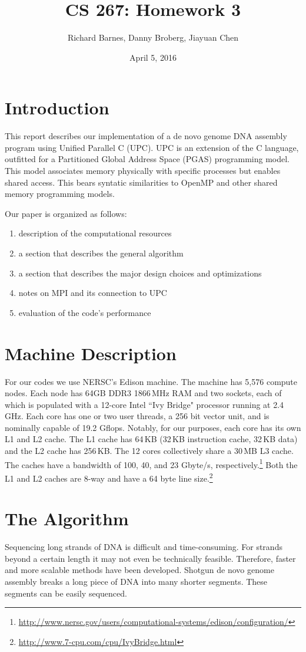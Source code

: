 \documentclass{article}
\title{CS 267: Homework 3}
\author{Richard Barnes, Danny Broberg, Jiayuan Chen}
\date{April 5, 2016}
\date{}
\begin{document}
\maketitle

\section{Introduction}
This report describes our implementation of a de novo genome DNA assembly program using Unified Parallel C (UPC). UPC is an extension of the C language, outfitted for a Partitioned Global Address Space (PGAS) programming model. This model associates memory physically with specific processes but enables shared access. This bears syntatic similarities to OpenMP and other shared memory programming models.

Our paper is organized as follows:
\begin{enumerate} %
\item description of the computational resources
\item a section that describes the general algorithm 
\item a section that describes the major design choices and optimizations
\item notes on MPI and its connection to UPC
\item evaluation of the code's performance
\end{enumerate}

\section{Machine Description}
For our codes we use NERSC's Edison machine. The machine has 5,576 compute nodes. Each node has 64GB DDR3 1866\,MHz RAM and two sockets, each of which is populated with a 12-core Intel ``Ivy Bridge" processor running at 2.4\,GHz. Each core has one or two user threads, a 256 bit vector unit, and is nominally capable of 19.2 Gflops. Notably, for our purposes, each core has its own L1 and L2 cache. The L1 cache has 64\,KB (32\,KB instruction cache, 32\,KB data) and the L2 cache has 256\,KB. The 12 cores collectively share a 30\,MB L3 cache. The caches have a bandwidth of 100, 40, and 23 Gbyte/s, respectively.\footnote{\url{http://www.nersc.gov/users/computational-systems/edison/configuration/}} Both the L1 and L2 caches are 8-way and have a 64 byte line size.\footnote{\url{http://www.7-cpu.com/cpu/IvyBridge.html}} 


\section{The Algorithm}
Sequencing long strands of DNA is difficult and time-consuming. For strands beyond a certain length it may not even be technically feasible. Therefore, faster and more scalable methods have been developed. Shotgun de novo genome assembly breaks a long piece of DNA into many shorter segments. These segments can be easily sequenced.
\end{document}
